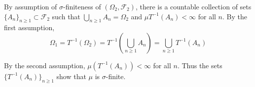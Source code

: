 \documentclass{article}
\newcommand{\F}{\mathcal{F}}
\begin{document}
By assumption of $\sigma$-finiteness of $(\Omega_2, \F_2)$, there is a countable collection of sets $\{A_n\}_{n \geq 1} \subset \F_2$ such that $\bigcup_{n \geq 1} A_n = \Omega_2$ and $\mu T^{-1}(A_n) < \infty$ for all $n$. By the first assumption,
\[
\Omega_1 = T^{-1}(\Omega_2) = T^{-1}\left( \bigcup_{n \geq 1} A_n \right) = \bigcup_{n \geq 1} T^{-1}(A_n)
\]

By the second assumption, $\mu(T^{-1}(A_n)) < \infty$ for all $n$. Thus the sets $\{T^{-1}(A_n)\}_{n \geq 1}$ show that $\mu$ is $\sigma$-finite.
\end{document}
